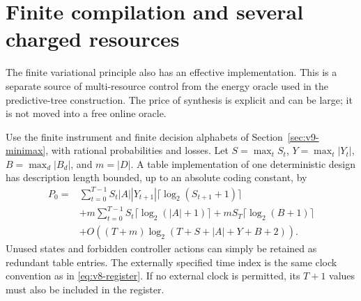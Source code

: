 \section{Finite compilation and several charged resources}
\label{sec:v9-compilation}
The finite variational principle also has an effective implementation.
This is a separate source of multi-resource control from the energy
oracle used in the predictive-tree construction. The price of synthesis
is explicit and can be large; it is not moved into a free online oracle.

Use the finite instrument and finite decision alphabets of
Section~\ref{sec:v9-minimax}, with rational probabilities and losses.
Let $S=\max_tS_t$, $Y=\max_t|Y_t|$, $B=\max_d|B_d|$, and $m=|D|$.
A table implementation of one deterministic design has description
length bounded, up to an absolute coding constant, by
\begin{align}
 P_0={}&\sum_{t=0}^{T-1} S_t|A||Y_{t+1}|
                                      \lceil\log_2(S_{t+1}+1)\rceil
                                                        \nonumber\\
 &+m\sum_{t=0}^{T-1}S_t\lceil\log_2(|A|+1)\rceil
   +mS_T\lceil\log_2(B+1)\rceil\nonumber\\
 &+O((T+m)\log_2(T+S+|A|+Y+B+2)).
 \label{eq:v9-tablebits}
\end{align}
Unused states and forbidden controller actions can simply be retained
as redundant table entries. The externally specified time index is the
same clock convention as in \eqref{eq:v8-register}. If no external clock
is permitted, its $T+1$ values must also be included in the register.

